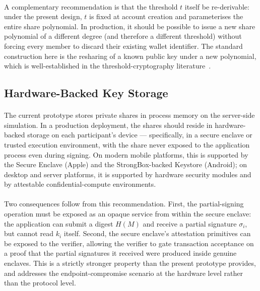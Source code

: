 \paragraph{}A complementary recommendation is that the threshold $t$ itself be re-derivable: under the present design, $t$ is fixed at account creation and parameterises the entire share polynomial. In production, it should be possible to issue a new share polynomial of a different degree (and therefore a different threshold) without forcing every member to discard their existing wallet identifier. The standard construction here is the resharing of a known public key under a new polynomial, which is well-established in the threshold-cryptography literature~\cite{gennaro2007, komlo2021}.

\subsection{Hardware-Backed Key Storage}
\label{sect:rec_hardware}

\paragraph{}The current prototype stores private shares in process memory on the server-side simulation. In a production deployment, the shares should reside in hardware-backed storage on each participant's device --- specifically, in a secure enclave or trusted execution environment, with the share never exposed to the application process even during signing. On modern mobile platforms, this is supported by the Secure Enclave (Apple) and the StrongBox-backed Keystore (Android); on desktop and server platforms, it is supported by hardware security modules and by attestable confidential-compute environments.

\paragraph{}Two consequences follow from this recommendation. First, the partial-signing operation must be exposed as an opaque service from within the secure enclave: the application can submit a digest $H(M)$ and receive a partial signature $\sigma_i$, but cannot read $k_i$ itself. Second, the secure enclave's attestation primitives can be exposed to the verifier, allowing the verifier to gate transaction acceptance on a proof that the partial signatures it received were produced inside genuine enclaves. This is a strictly stronger property than the present prototype provides, and addresses the endpoint-compromise scenario at the hardware level rather than the protocol level.

